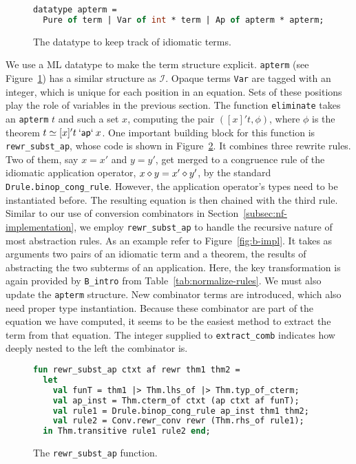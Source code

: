 \begin{figure}[h]
\begin{lstlisting}[language=ML]
datatype apterm =
  Pure of term | Var of int * term | Ap of apterm * apterm;
\end{lstlisting}
\caption{The datatype to keep track of idiomatic terms.}
\label{fig:apterm}
\end{figure}

We use a ML datatype to make the term structure explicit.
\texttt{apterm} (see Figure~\ref{fig:apterm}) has a similar structure as $\mathcal{I}$.
Opaque terms \texttt{Var} are tagged with an integer, which is unique for each
position in an equation.
Sets of these positions play the role of variables in the previous section.
The function \texttt{eliminate} takes an \texttt{apterm} $t$ and such a set $x$,
computing the pair $([x]'t,\phi)$, where $\phi$ is the theorem
$t \simeq [x]'t \mathbin{\mathsf{`ap`}} x$.
One important building block for this function is \texttt{rewr\_subst\_ap},
whose code is shown in Figure~\ref{fig:rewr-subst-ap}.
It combines three rewrite rules.
Two of them, say $x = x'$ and $y = y'$, get merged to a congruence rule of the
idiomatic application operator, $x \diamond y = x' \diamond y'$, by the standard
\texttt{Drule.binop\_cong\_rule}.
However, the application operator's types need to be instantiated before.
The resulting equation is then chained with the third rule.
Similar to our use of conversion combinators in Section~\ref{subsec:nf-implementation},
we employ \texttt{rewr\_subst\_ap} to handle the recursive nature of most
abstraction rules.
As an example refer to Figure~\ref{fig:b-impl}.
It takes as arguments two pairs of an idiomatic term and a theorem, the results
of abstracting the two subterms of an application.
Here, the key transformation is again provided by \texttt{B\_intro} from
Table~\ref{tab:normalize-rules}.
We must also update the \texttt{apterm} structure.
New combinator terms are introduced, which also need proper type instantiation.
Because these combinator are part of the equation we have computed, it seems
to be the easiest method to extract the term from that equation.
The integer supplied to \texttt{extract\_comb} indicates how deeply nested to
the left the combinator is.

\begin{figure}[t]
\begin{lstlisting}[language=ML]
fun rewr_subst_ap ctxt af rewr thm1 thm2 =
  let
    val funT = thm1 |> Thm.lhs_of |> Thm.typ_of_cterm;
    val ap_inst = Thm.cterm_of ctxt (ap ctxt af funT);
    val rule1 = Drule.binop_cong_rule ap_inst thm1 thm2;
    val rule2 = Conv.rewr_conv rewr (Thm.rhs_of rule1);
  in Thm.transitive rule1 rule2 end;
\end{lstlisting}
\caption{The \texttt{rewr\_subst\_ap} function.}
\label{fig:rewr-subst-ap}
\end{figure}

